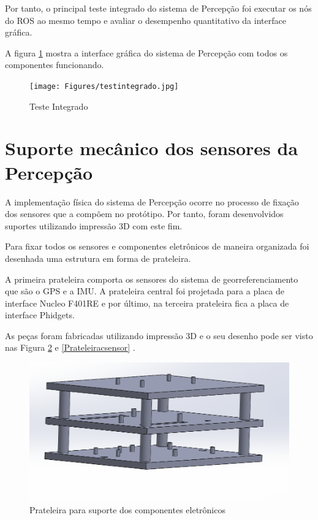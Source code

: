 Por tanto, o principal teste integrado do sistema de Percepção foi executar os nós do ROS ao mesmo tempo e avaliar o desempenho quantitativo da interface gráfica.

A figura \ref{fig:testint} mostra a interface gráfica do sistema de Percepção com todos os componentes funcionando.

    \begin{figure}[!ht]
    	\centering
    	\texttt{[image: Figures/testintegrado.jpg]}
    	\caption{Teste Integrado} \label{fig:testint}
	\end{figure}

\section{Suporte mecânico dos sensores da Percepção}

A implementação física do sistema de Percepção ocorre no processo de fixação dos sensores que a compõem no protótipo. Por tanto, foram desenvolvidos suportes utilizando impressão 3D com este fim.

Para  fixar  todos  os  sensores  e  componentes  eletrônicos  de  maneira  organizada foi desenhada uma estrutura em forma de prateleira.

 A primeira prateleira comporta os sensores do sistema de georreferenciamento que são o GPS e a IMU. A prateleira central foi projetada para a placa de interface Nucleo F401RE e por último, na terceira prateleira fica a placa de interface Phidgets.
 
As peças foram fabricadas utilizando impressão 3D e o seu desenho pode ser visto nas Figura \ref{Prateleira} e \ref{Prateleiracsensor} .

 \begin{figure}[h]
 	\centering
 	\includegraphics[width=14cm]{Figures/prateleira.png}
 	\caption{Prateleira para suporte dos componentes eletrônicos} \label{Prateleira}
 \end{figure}
 

